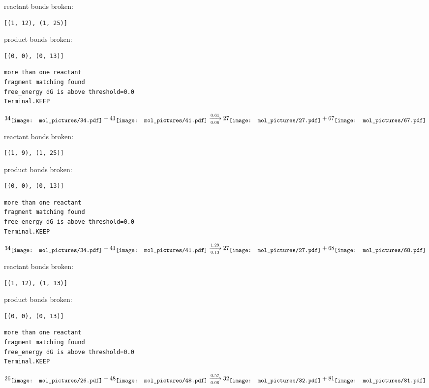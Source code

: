 \documentclass{article}
\begin{document}
reactant bonds broken:\begin{verbatim}
[(1, 12), (1, 25)]
\end{verbatim}
product bonds broken:\begin{verbatim}
[(0, 0), (0, 13)]
\end{verbatim}




\vspace{1cm}
\begin{verbatim}
more than one reactant
fragment matching found
free_energy dG is above threshold=0.0
Terminal.KEEP
\end{verbatim}
$$
34
\raisebox{-.5\height}{\texttt{[image: mol\_pictures/34.pdf]}}
+
41
\raisebox{-.5\height}{\texttt{[image: mol\_pictures/41.pdf]}}
\xrightarrow[0.06]{0.61}
27
\raisebox{-.5\height}{\texttt{[image: mol\_pictures/27.pdf]}}
+
67
\raisebox{-.5\height}{\texttt{[image: mol\_pictures/67.pdf]}}
$$


reactant bonds broken:\begin{verbatim}
[(1, 9), (1, 25)]
\end{verbatim}
product bonds broken:\begin{verbatim}
[(0, 0), (0, 13)]
\end{verbatim}




\vspace{1cm}
\begin{verbatim}
more than one reactant
fragment matching found
free_energy dG is above threshold=0.0
Terminal.KEEP
\end{verbatim}
$$
34
\raisebox{-.5\height}{\texttt{[image: mol\_pictures/34.pdf]}}
+
41
\raisebox{-.5\height}{\texttt{[image: mol\_pictures/41.pdf]}}
\xrightarrow[0.13]{1.29}
27
\raisebox{-.5\height}{\texttt{[image: mol\_pictures/27.pdf]}}
+
68
\raisebox{-.5\height}{\texttt{[image: mol\_pictures/68.pdf]}}
$$


reactant bonds broken:\begin{verbatim}
[(1, 12), (1, 13)]
\end{verbatim}
product bonds broken:\begin{verbatim}
[(0, 0), (0, 13)]
\end{verbatim}




\vspace{1cm}
\begin{verbatim}
more than one reactant
fragment matching found
free_energy dG is above threshold=0.0
Terminal.KEEP
\end{verbatim}
$$
26
\raisebox{-.5\height}{\texttt{[image: mol\_pictures/26.pdf]}}
+
48
\raisebox{-.5\height}{\texttt{[image: mol\_pictures/48.pdf]}}
\xrightarrow[0.06]{0.57}
32
\raisebox{-.5\height}{\texttt{[image: mol\_pictures/32.pdf]}}
+
81
\raisebox{-.5\height}{\texttt{[image: mol\_pictures/81.pdf]}}
$$
\end{document}
